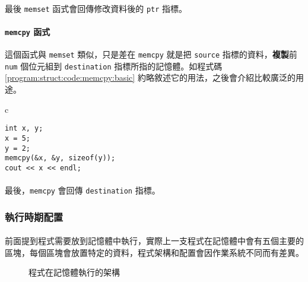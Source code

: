 \documentclass[12pt,a4paper,oneside]{article}
\begin{document}
\begin{CJK}{UTF8}{bkai}
\paragraph{}最後 \lstinline!memset! 函式會回傳修改資料後的 \lstinline!ptr! 指標。

\paragraph{\lstinline!memcpy! 函式}這個函式與 \lstinline!memset! 類似，只是差在 \lstinline!memcpy! 就是把 \lstinline!source! 指標的資料，{\color{blue}\textbf{複製}}前 \lstinline!num! 個位元組到 \lstinline!destination! 指標所指的記憶體。如程式碼 \ref{program:struct:code:memcpy:basic} 約略敘述它的用法，之後會介紹比較廣泛的用途。

\begin{code}[h!]
\centering
\begin{tabular}{c}
\begin{lstlisting}
int x, y;
x = 5;
y = 2;
memcpy(&x, &y, sizeof(y));
cout << x << endl;
\end{lstlisting}
\end{tabular}
\caption{\lstinline!memcpy! 用法}
\label{program:struct:code:memcpy:basic}
\end{code}

\paragraph{}最後，\lstinline!memcpy! 會回傳 \lstinline!destination! 指標。

\subsubsection{執行時期配置}

\paragraph{}前面提到程式需要放到記憶體中執行，實際上一支程式在記憶體中會有五個主要的區塊，每個區塊會放置特定的資料，程式架構和配置會因作業系統不同而有差異。

\begin{figure}[h!]
\centering
{}
\caption{程式在記憶體執行的架構}
\label{program:struct:fig:program}
\end{figure}


\end{CJK}
\end{document}
